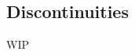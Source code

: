 \documentclass[../poma-notes.tex]{subfiles}
\begin{document}
\subsection*{Discontinuities}

WIP
\end{document}
